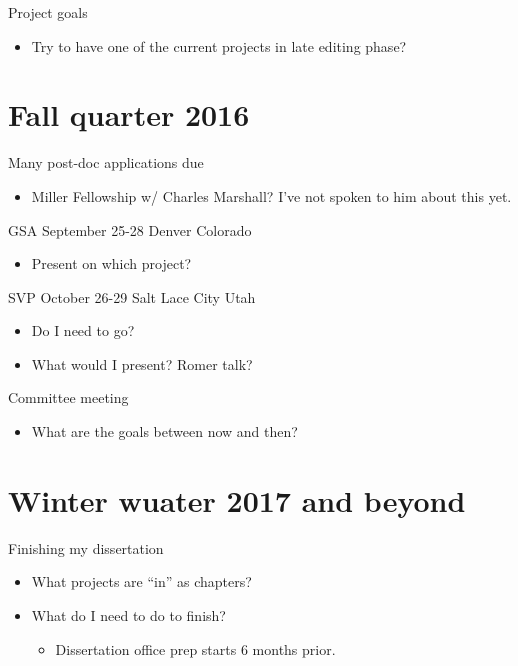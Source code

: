 \documentclass{article}
\begin{document}
Project goals
\begin{itemize}
  \item Try to have one of the current projects in late editing phase?
\end{itemize}


\section{Fall quarter 2016}
Many post-doc applications due
\begin{itemize}
  \item Miller Fellowship w/ Charles Marshall? I've not spoken to him about this yet.
\end{itemize}

GSA September 25-28 Denver Colorado
\begin{itemize}
  \item Present on which project?
\end{itemize}

SVP October 26-29 Salt Lace City Utah
\begin{itemize}
  \item Do I need to go?
  \item What would I present? Romer talk?
\end{itemize}

Committee meeting
\begin{itemize}
  \item What are the goals between now and then?
\end{itemize}


\section{Winter wuater 2017 and beyond}
Finishing my dissertation
\begin{itemize}
  \item What projects are ``in'' as chapters?
  \item What do I need to do to finish?
    \begin{itemize}
      \item Dissertation office prep starts 6 months prior.
    \end{itemize}
\end{itemize}
\end{document}
